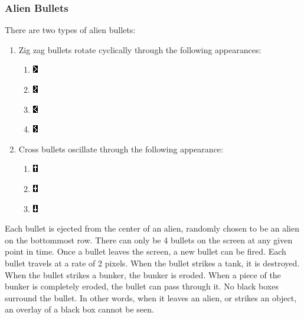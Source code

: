 \documentclass[11pt,letter,oneside]{report}
\begin{document}
\subsubsection{Alien Bullets}
There are two types of alien bullets:
\begin{enumerate}
\item{}  Zig zag bullets rotate cyclically through the following appearances:

\begin{enumerate}
\item 
 \includegraphics[scale=2]{ZigBullet0.png}
\item 
 \includegraphics[scale=2]{ZigBullet1.png}
\item
 \includegraphics[scale=2]{ZigBullet2.png}
\item
 \includegraphics[scale=2]{ZigBullet3.png}
\end{enumerate}

\item{}  Cross bullets oscillate through the following appearance:

\begin{enumerate}
\item
 \includegraphics[scale=2]{TBullet0.png}
\item
 \includegraphics[scale=2]{TBullet1.png}
\item
 \includegraphics[scale=2]{TBullet2.png}
\end{enumerate}

\end{enumerate}

Each bullet is ejected from the center of an alien, randomly chosen to be an alien on the bottommost row. There can only be 4 bullets on the screen at any given point in time.  Once a bullet leaves the screen, a new bullet can be fired. Each bullet travels at a rate of 2 pixels. When the bullet strikes a tank, it is destroyed. When the bullet strikes a bunker, the bunker is eroded. When a piece of the bunker is completely eroded, the bullet can pass through it.  No black boxes surround the bullet. In other words, when it leaves an alien, or strikes an object, an overlay of a black box cannot be seen. 
\end{document}
